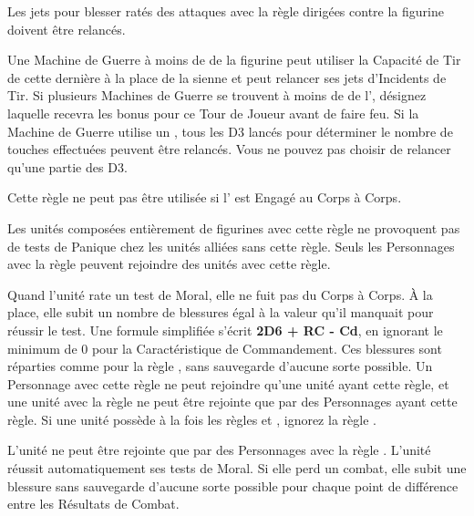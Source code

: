 
Les jets pour blesser ratés des attaques avec la règle \flamingattacks{} dirigées contre la figurine doivent être relancés.


Une Machine de Guerre à moins de  de la figurine peut utiliser la Capacité de Tir de cette dernière à la place de la sienne et peut relancer ses jets d'Incidents de Tir. Si plusieurs Machines de Guerre se trouvent à moins de  de l'\engineer{}, désignez laquelle recevra les bonus pour ce Tour de Joueur avant de faire feu. Si la Machine de Guerre utilise un \flamethrower{}, tous les D3 lancés pour déterminer le nombre de touches effectuées peuvent être relancés. Vous ne pouvez pas choisir de relancer qu'une partie des D3.

Cette règle ne peut pas être utilisée si l'\engineer{} est Engagé au Corps à Corps.


Les unités composées entièrement de figurines avec cette règle ne provoquent pas de tests de Panique chez les unités alliées sans cette règle. Seuls les Personnages avec la règle \insignificant{} peuvent rejoindre des unités avec cette règle.

\label{daemonicinstability}

Quand l'unité rate un test de Moral, elle ne fuit pas du Corps à Corps. À la place, elle subit un nombre de blessures égal à la valeur qu'il manquait pour réussir le test. Une formule simplifiée s'écrit \textbf{2D6 + RC - Cd}, en ignorant le minimum de 0 pour la Caractéristique de Commandement. Ces blessures sont réparties comme pour la règle \unstable{}, sans sauvegarde d'aucune sorte possible. Un Personnage avec cette règle ne peut rejoindre qu'une unité ayant cette règle, et une unité avec la règle \daemonicinstability{} ne peut être rejointe que par des Personnages ayant cette règle. Si une unité possède à la fois les règles \daemonicinstability{} et \unstable{}, ignorez la règle \unstable{}.


L'unité ne peut être rejointe que par des Personnages avec la règle \unstable{}. L'unité réussit automatiquement ses tests de Moral. Si elle perd un combat, elle subit une blessure sans sauvegarde d'aucune sorte possible pour chaque point de différence entre les Résultats de Combat.

